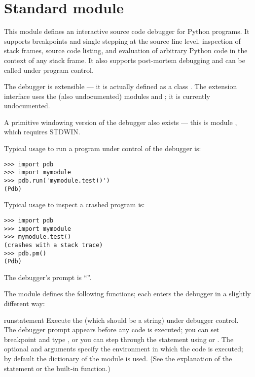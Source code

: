 \section{Standard module }

This module defines an interactive source code debugger for Python
programs.  It supports breakpoints and single stepping at the source
line level, inspection of stack frames, source code listing, and
evaluation of arbitrary Python code in the context of any stack frame.
It also supports post-mortem debugging and can be called under program
control.

The debugger is extensible --- it is actually defined as a class
.  The extension interface uses the (also undocumented)
modules  and ; it is currently undocumented.

A primitive windowing version of the debugger also exists --- this is
module , which requires STDWIN.

Typical usage to run a program under control of the debugger is:

\begin{verbatim}
>>> import pdb
>>> import mymodule
>>> pdb.run('mymodule.test()')
(Pdb)
\end{verbatim}

Typical usage to inspect a crashed program is:

\begin{verbatim}
>>> import pdb
>>> import mymodule
>>> mymodule.test()
(crashes with a stack trace)
>>> pdb.pm()
(Pdb)
\end{verbatim}

The debugger's prompt is ``''.

The module defines the following functions; each enters the debugger
in a slightly different way:

\begin{funcdesc}{run}{statement}
Execute the  (which should be a string) under debugger
control.  The debugger prompt appears before any code is executed; you
can set breakpoint and type , or you can step through
the statement using  or .  The optional
 and  arguments specify the environment in
which the code is executed; by default the dictionary of the module
 is used.  (See the explanation of the 
statement or the  built-in function.)
\end{funcdesc}

